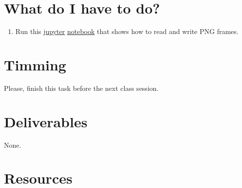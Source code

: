 \section{What do I have to do?}

\begin{enumerate}
\item Run this \href{https://jupyter.org/}{jupyter}
  \href{https://github.com/Sistemas-Multimedia/Sistemas-Multimedia.github.io/blob/master/contents/PNG/display_video.ipynb}{notebook}
  that shows how to read and write PNG frames.
\end{enumerate}

\section{Timming}

Please, finish this task before the next class session.

\section{Deliverables}

None.

\section{Resources}

\renewcommand{\addcontentsline}[3]{}%

